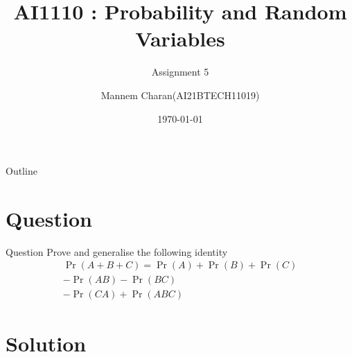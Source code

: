 \documentclass{beamer}
\title{AI1110 : Probability and Random Variables}
\subtitle{Assignment 5}
\author{Mannem Charan(AI21BTECH11019)}
\date{\today}
\providecommand{\pr}[1]{\ensuremath{\Pr\left(#1\right)}}
\begin{document}
\begin{frame}
    \titlepage 
\end{frame}


\begin{frame}{Outline}
    \tableofcontents
\end{frame}


\section{Question}
\begin{frame}{Question}
Prove and generalise the following identity
       \begin{equation}
          \begin{split}
              \pr{A+B+C} = \pr{A} + \pr{B} + \pr{C}\\ 
                                          - \pr{AB} -\pr{BC} \\
                                          -\pr{CA} + \pr{ABC}
         \end{split}
        \end{equation}
\end{frame}

\section{Solution}
\end{document}
